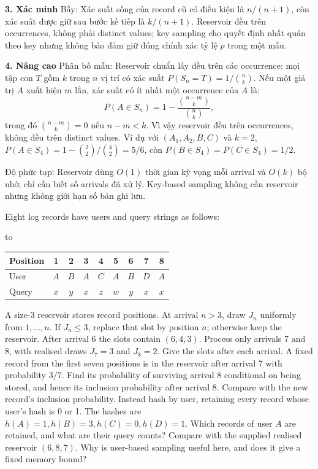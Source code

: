 \documentclass[10pt,a4paper,twocolumn]{article}
\newcommand{\key}[1]{#1:\enspace}
\newenvironment{examtable}[1]{%
  \par\addvspace{2pt}\noindent\hbox to \linewidth\bgroup\hfil
  \setlength{\tabcolsep}{4pt}%
  \renewcommand{\arraystretch}{1.12}\begin{tabular}{#1}%
}{\end{tabular}\hfil\egroup\par\addvspace{2pt}}
\newcommand{\unitheading}[2]{%
  \par\addvspace{1pt}\noindent\textbf{#1. #2}\enspace}
\newcommand{\unitverification}{\unitheading{3}{Xác minh}}
\newcommand{\unitadvanced}{\unitheading{4}{Nâng cao}}
\begin{document}
\unitverification
\key{Bẫy} Xác suất sống của record cũ có điều kiện là $n/(n+1)$, còn xác suất được giữ sau bước kế tiếp là $k/(n+1)$. Reservoir đều trên occurrences, không phải distinct values; key sampling cho quyết định nhất quán theo key nhưng không bảo đảm giữ đúng chính xác tỷ lệ $p$ trong một mẫu.


\unitadvanced
\key{Phân bố mẫu} Reservoir chuẩn lấy đều trên các occurrence: mọi tập con $T$ gồm $k$ trong $n$ vị trí có xác suất $P(S_n=T)=1/\binom{n}{k}$. Nếu một giá trị $A$ xuất hiện $m$ lần, xác suất có ít nhất một occurrence của $A$ là:
\[
P(A\in S_n)=1-\frac{\binom{n-m}{k}}{\binom{n}{k}},
\]
trong đó $\binom{n-m}{k}=0$ nếu $n-m<k$. Vì vậy reservoir đều trên occurrences, không đều trên distinct values. Ví dụ với $(A_1,A_2,B,C)$ và $k=2$, $P(A\in S_4)=1-\binom22/\binom42=5/6$, còn $P(B\in S_4)=P(C\in S_4)=1/2$.

\key{Độ phức tạp} Reservoir dùng $O(1)$ thời gian kỳ vọng mỗi arrival và $O(k)$ bộ nhớ; chỉ cần biết số arrivals đã xử lý. Key-based sampling không cần reservoir nhưng không giới hạn số bản ghi lưu.

Eight log records have users and query strings as follows:
\begin{examtable}{@{}lcccccccc@{}}
\toprule
Position & 1 & 2 & 3 & 4 & 5 & 6 & 7 & 8\\
\midrule
User & $A$ & $B$ & $A$ & $C$ & $A$ & $B$ & $D$ & $A$\\
Query & $x$ & $y$ & $x$ & $z$ & $w$ & $y$ & $x$ & $x$\\
\bottomrule
\end{examtable}
A size-3 reservoir stores record positions. At arrival $n>3$, draw $J_n$ uniformly from $1,\ldots,n$. If $J_n\le3$, replace that slot by position $n$; otherwise keep the reservoir.
 After arrival 6 the slots contain $(6,4,3)$. Process only arrivals 7 and 8, with realised draws $J_7=3$ and $J_8=2$. Give the slots after each arrival.
 A fixed record from the first seven positions is in the reservoir after arrival 7 with probability $3/7$. Find its probability of surviving arrival 8 conditional on being stored, and hence its inclusion probability after arrival 8. Compare with the new record's inclusion probability.
 Instead hash by user, retaining every record whose user's hash is 0 or 1. The hashes are $h(A)=1,h(B)=3,h(C)=0,h(D)=1$. Which records of user $A$ are retained, and what are their query counts? Compare with the supplied realised reservoir $(6,8,7)$. Why is user-based sampling useful here, and does it give a fixed memory bound?
\end{document}
